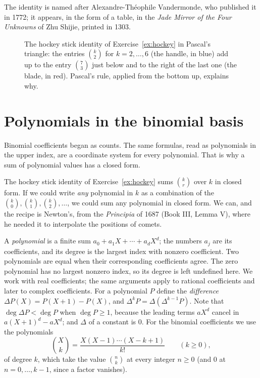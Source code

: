 The identity is named after Alexandre-Th\'eophile Vandermonde, who published it in 1772; it appears, in the form of a table, in the \emph{Jade Mirror of
the Four Unknowns} of Zhu Shijie, printed in 1303.

\begin{figure}[ht]
\centering
{}
\caption{The hockey stick identity of Exercise~\ref{ex:hockey} in Pascal's triangle: the entries $\binom k2$ for $k=2,\dots,6$ (the handle, in blue) add up to the entry $\binom73$ just below and to the right of the last one (the blade, in red). Pascal's rule, applied from the bottom up, explains why.}
\label{fig:hockey}
\end{figure}

\section{Polynomials in the binomial basis}

Binomial coefficients began as counts. The same formulas, read as polynomials in the upper index, are a coordinate system for every polynomial. That is why a sum of polynomial values has a closed form.

The hockey stick identity of Exercise~\ref{ex:hockey} sums $\binom kr$ over $k$ in closed form. If we could write \emph{any} polynomial in $k$ as a
combination of the $\binom k0,\binom k1,\binom k2,\dots$, we could sum any polynomial in closed form. We can, and the recipe is Newton's, from the
\emph{Principia} of 1687 (Book III, Lemma V), where he needed it to interpolate the positions of comets.

A \emph{polynomial} is a finite sum $a_0+a_1X+\cdots+a_dX^d$; the numbers $a_j$ are its coefficients, and its degree is the largest index with nonzero coefficient. Two polynomials are equal when their corresponding coefficients agree. The zero polynomial has no largest nonzero index, so its degree is left undefined here. We work with real coefficients; the same arguments apply to rational coefficients and later to complex coefficients. For a polynomial $P$ define the \emph{difference} $\Delta P(X)=P(X+1)-P(X)$, and $\Delta^kP=\Delta(\Delta^{k-1}P)$.
Note that $\deg\Delta P<\deg P$ when $\deg P\ge1$, because the leading terms $aX^d$ cancel in $a(X+1)^d-aX^d$; and $\Delta$ of a constant is $0$.
For the binomial coefficients we use the polynomials
\[
\binom Xk=\frac{X(X-1)\cdots(X-k+1)}{k!}\qquad(k\ge0),
\]
of degree $k$, which take the value $\binom nk$ at every integer $n\ge0$ (and $0$ at $n=0,\dots,k-1$, since a factor vanishes).

